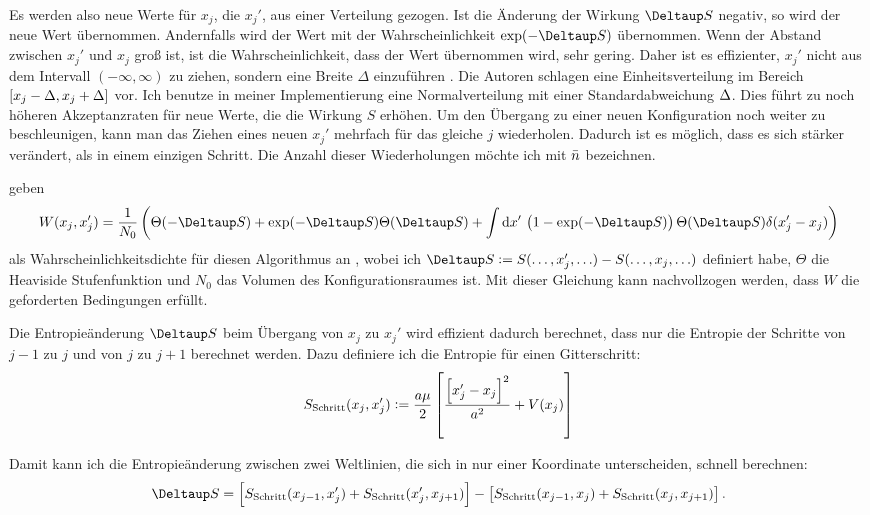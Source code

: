 Es werden also neue Werte für $x_j$, die $x_j'$, aus einer Verteilung gezogen.
Ist die Änderung der Wirkung $\Deltaup S$ negativ, so wird der neue Wert
übernommen. Andernfalls wird der Wert mit der Wahrscheinlichkeit
$\exp(-\Deltaup S)$ übernommen. Wenn der Abstand zwischen $x_j'$ und $x_j$ groß
ist, ist die Wahrscheinlichkeit, dass der Wert übernommen wird, sehr gering.
Daher ist es effizienter, $x_j'$ nicht aus dem Intervall $(-\infty, \infty)$ zu
ziehen, sondern eine Breite $\Delta$ einzuführen
\parencite[439]{Creutz/Statistical_Approach_QM}. Die Autoren schlagen eine
Einheitsverteilung im Bereich $[x_j - \Delta, x_j + \Delta]$ vor. Ich benutze
in meiner Implementierung eine Normalverteilung mit einer Standardabweichung
$\Delta$. Dies führt zu noch höheren Akzeptanzraten für neue Werte, die die
Wirkung $S$ erhöhen. Um den Übergang zu einer neuen Konfiguration noch weiter
zu beschleunigen, kann man das Ziehen eines neuen $x_j'$ mehrfach für das
gleiche $j$ wiederholen. Dadurch ist es möglich, dass es sich stärker
verändert, als in einem einzigen Schritt. Die Anzahl dieser Wiederholungen
möchte ich mit $\bar n$ bezeichnen.

\citeauthor{Creutz/Statistical_Approach_QM} geben
\[
    W(x_j, x_j') = \frac1{N_0} \del{
        \Theta(-\Deltaup S) + \exp(- \Deltaup S) \Theta(\Deltaup S)
        + \int \dif x' \, \del{
            1 - \exp(-\Deltaup S)
        } \Theta(\Deltaup S) \delta(x_j' - x_j)
    }
\]
als Wahrscheinlichkeitsdichte für diesen Algorithmus an
\parencite[(3.28)]{Creutz/Statistical_Approach_QM}, wobei ich $\Deltaup S :=
S(\ldots, x_j', \ldots) - S(\ldots, x_j, \ldots)$ definiert habe, $\Theta$ die
Heaviside Stufenfunktion und $N_0$ das Volumen des Konfigurationsraumes ist.
Mit dieser Gleichung kann nachvollzogen werden, dass $W$ die geforderten
Bedingungen erfüllt.

Die Entropieänderung $\Deltaup S$ beim Übergang von $x_j$ zu $x_j'$ wird
effizient dadurch berechnet, dass nur die Entropie der Schritte von $j-1$ zu
$j$ und von $j$ zu $j+1$ berechnet werden. Dazu definiere ich die Entropie für
einen Gitterschritt:
\[
    S_\text{Schritt}(x_j, x_j') :=
    \frac{\timestep \mass}2 \sbr{ \frac{\sbr{x_j' - x_j}^2}{\timestep^2} + V(x_j)}
\]

Damit kann ich die Entropieänderung zwischen zwei Weltlinien, die sich in nur
einer Koordinate unterscheiden, schnell berechnen:
\[
    \Deltaup S =
    \sbr{S_\text{Schritt}(x_{j-1}, x_{j}') + S_\text{Schritt}(x_{j}', x_{j+1})}
    -
    \sbr{S_\text{Schritt}(x_{j-1}, x_{j}) + S_\text{Schritt}(x_{j}, x_{j+1})}.
\]

